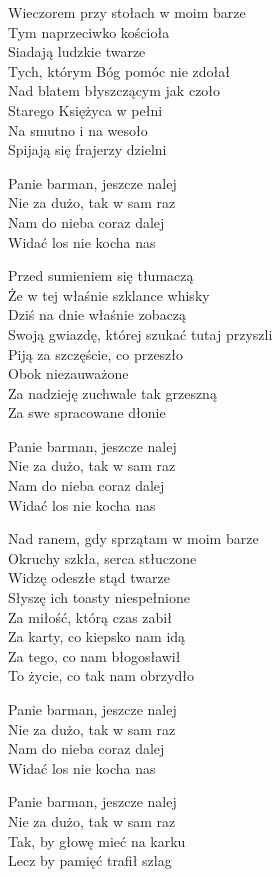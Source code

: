 \begin{text}
    
    Wieczorem przy stołach w moim barze\\
    Tym naprzeciwko kościoła\\
    Siadają ludzkie twarze\\
    Tych, którym Bóg pomóc nie zdołał\\
    Nad blatem błyszczącym jak czoło\\
    Starego Księżyca w pełni\\
    Na smutno i na wesoło\\
    Spijają się frajerzy dzielni

    \vin Panie barman, jeszcze nalej\\
    \vin Nie za dużo, tak w sam raz\\
    \vin Nam do nieba coraz dalej\\
    \vin Widać los nie kocha nas

    Przed sumieniem się tłumaczą\\
    Że w tej właśnie szklance whisky\\
    Dziś na dnie właśnie zobaczą\\
    Swoją gwiazdę, której szukać tutaj przyszli\\
    Piją za szczęście, co przeszło\\
    Obok niezauważone\\
    Za nadzieję zuchwale tak grzeszną\\
    Za swe spracowane dłonie

    \vin  Panie barman, jeszcze nalej\\
    \vin Nie za dużo, tak w sam raz\\
    \vin Nam do nieba coraz dalej\\
    \vin Widać los nie kocha nas

    Nad ranem, gdy sprzątam w moim barze\\
    Okruchy szkła, serca stłuczone\\
    Widzę odeszłe stąd twarze\\
    Słyszę ich toasty niespełnione\\
    Za miłość, którą czas zabił\\
    Za karty, co kiepsko nam idą\\
    Za tego, co nam błogosławił\\
    To życie, co tak nam obrzydło

    \vin Panie barman, jeszcze nalej\\
    \vin Nie za dużo, tak w sam raz\\
    \vin Nam do nieba coraz dalej\\
    \vin Widać los nie kocha nas

    \vin Panie barman, jeszcze nalej\\
    \vin Nie za dużo, tak w sam raz\\
    \vin Tak, by głowę mieć na karku\\
    \vin Lecz by pamięć trafił szlag
	
	
	
\end{text}
